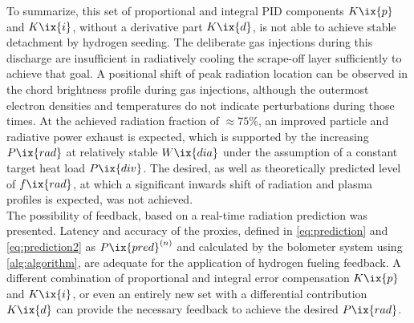             To summarize, this set of proportional and integral PID components $K\ix{p}$ and $K\ix{i}$, without a derivative part $K\ix{d}$, is not able to achieve stable detachment by hydrogen seeding. The deliberate gas injections during this discharge are insufficient in radiatively cooling the scrape-off layer sufficiently to achieve that goal. A positional shift of peak radiation location can be observed in the chord brightness profile during gas injections, although the outermost electron densities and temperatures do not indicate perturbations during those times. At the achieved radiation fraction of $\approx75\%$, an improved particle and radiative power exhaust is expected, which is supported by the increasing $P\ix{rad}$ at relatively stable $W\ix{dia}$ under the assumption of a constant target heat load $P\ix{div}$. The desired, as well as theoretically predicted level of $f\ix{rad}$\cite{Feng2016}, at which a significant inwards shift of radiation and plasma profiles is expected, was not achieved.\\%
            The possibility of feedback, based on a real-time radiation prediction was presented. Latency and accuracy of the proxies, defined in \cref{eq:prediction} and \cref{eq:prediction2} as $P\ix{pred}^{\left(n\right)}$ and calculated by the bolometer system using \autoref{alg:algorithm}, are adequate for the application of hydrogen fueling feedback. A different combination of proportional and integral error compensation $K\ix{p}$ and $K\ix{i}$, or even an entirely new set with a differential contribution $K\ix{d}$ can provide the necessary feedback to achieve the desired $P\ix{rad}$.%
            
